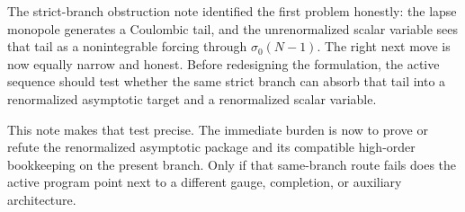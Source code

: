\documentclass[11pt]{article}
\begin{document}
The strict-branch obstruction note identified the first problem honestly: the lapse monopole generates a Coulombic tail, and the unrenormalized scalar variable sees that tail as a nonintegrable forcing through \(\sigma_0(N-1)\). The right next move is now equally narrow and honest. Before redesigning the formulation, the active sequence should test whether the same strict branch can absorb that tail into a renormalized asymptotic target and a renormalized scalar variable.

This note makes that test precise. The immediate burden is now to prove or refute the renormalized asymptotic package and its compatible high-order bookkeeping on the present branch. Only if that same-branch route fails does the active program point next to a different gauge, completion, or auxiliary architecture.
\end{document}
